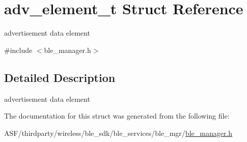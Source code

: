 \hypertarget{structadv__element__t}{}\section{adv\+\_\+element\+\_\+t Struct Reference}
\label{structadv__element__t}


advertisement data element  




{\ttfamily \#include $<$ble\+\_\+manager.\+h$>$}



\subsection{Detailed Description}
advertisement data element 

The documentation for this struct was generated from the following file\+:\begin{DoxyCompactItemize}
\item 
A\+S\+F/thirdparty/wireless/ble\+\_\+sdk/ble\+\_\+services/ble\+\_\+mgr/\mbox{\hyperlink{ble__manager_8h}{ble\+\_\+manager.\+h}}\end{DoxyCompactItemize}
